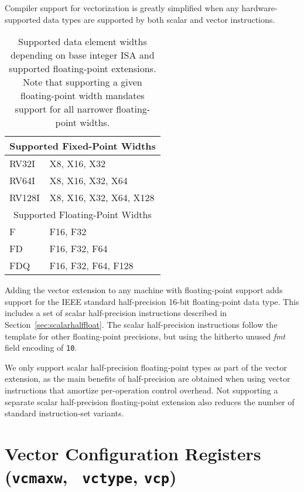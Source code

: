 \begin{commentary}
  Compiler support for vectorization is greatly simplified when any
  hardware-supported data types are supported by both scalar and
  vector instructions.
\end{commentary}

\begin{table}
  \centering
\begin{tabular}{|l|l|}
  \hline
  \multicolumn{2}{|c|}{Supported Fixed-Point Widths} \\
  \hline
  RV32I  & X8, X16, X32 \\
  RV64I  & X8, X16, X32, X64 \\
  RV128I & X8, X16, X32, X64, X128 \\
  \hline
  \hline
  \multicolumn{2}{|c|}{Supported Floating-Point Widths} \\
  \hline
  F      & F16, F32 \\
  FD     & F16, F32, F64 \\
  FDQ    & F16, F32, F64, F128 \\
  \hline
\end{tabular}
\caption{Supported data element widths depending on base integer ISA
  and supported floating-point extensions.  Note that supporting a
  given floating-point width mandates support for all narrower
  floating-point widths.}
\label{tab:velemtypes}
\end{table}

Adding the vector extension to any machine with floating-point support
adds support for the IEEE standard half-precision 16-bit
floating-point data type.  This includes a set of scalar
half-precision instructions described in
Section~\ref{sec:scalarhalffloat}.  The scalar half-precision
instructions follow the template for other floating-point precisions,
but using the hitherto unused {\em fmt} field encoding of {\tt 10}.

\begin{samepage-commentary}
  We only support scalar half-precision floating-point types as part
  of the vector extension, as the main benefits of half-precision are
  obtained when using vector instructions that amortize per-operation
  control overhead.  Not supporting a separate scalar half-precision
  floating-point extension also reduces the number of standard
  instruction-set variants.
\end{samepage-commentary}

\section{Vector Configuration Registers ({\tt vcmaxw}, {\tt
    vctype}, {\tt vcp})}

